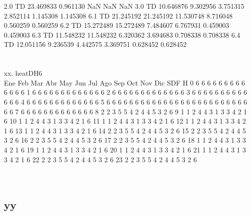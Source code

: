 \documentclass[a4paper,10pt,twocolumn]{article}
\begin{document}
\begin{Form}
2.0 TD  23.469833   0.961130        NaN        NaN        NaN          
3.0 TD  10.646876   9.302956   3.751315   2.852114   1.145308  1.145308
6.1 TD  21.245192  21.245192  11.530748   8.716048   0.560259  0.560259
6.2 TD  15.272489  15.272489   7.484607   6.767931   0.459003  0.459003
6.3 TD  11.548232  11.548232   6.320362   3.694683   0.708338  0.708338
6.4 TD  12.051156   9.236539   4.442575   3.369751   0.628452  0.628452 \\\\\\xx. heatDH6 \\     Ene  Feb  Mar  Abr  May  Jun  Jul  Ago  Sep  Oct  Nov  Dic  SDF
H                                                                  
0     6    6    6    6    6    6    6    6    6    6    6    6    6
1     6    6    6    6    6    6    6    6    6    6    6    6    6
2     6    6    6    6    6    6    6    6    6    6    6    6    6
3     6    6    6    6    6    6    6    6    6    6    6    6    6
4     6    6    6    6    6    6    6    6    6    6    6    6    6
5     6    6    6    6    6    6    6    6    6    6    6    6    6
6     6    6    6    6    6    6    6    6    6    6    6    6    6
7     6    6    6    6    6    6    6    6    6    6    6    6    6
8     2    2    3    5    5    4    2    4    4    5    3    2    6
9     1    1    2    4    4    3    1    3    3    4    2    1    6
10    1    1    2    4    4    3    1    3    3    4    2    1    6
11    1    1    2    4    4    3    1    3    3    4    2    1    6
12    1    1    2    4    4    3    1    3    3    4    2    1    6
13    1    1    2    4    4    3    1    3    3    4    2    1    6
14    2    2    3    5    5    4    2    4    4    5    3    2    6
15    2    2    3    5    5    4    2    4    4    5    3    2    6
16    2    2    3    5    5    4    2    4    4    5    3    2    6
17    2    2    3    5    5    4    2    4    4    5    3    2    6
18    1    1    2    4    4    3    1    3    3    4    2    1    6
19    1    1    2    4    4    3    1    3    3    4    2    1    6
20    1    1    2    4    4    3    1    3    3    4    2    1    6
21    1    1    2    4    4    3    1    3    3    4    2    1    6
22    2    2    3    5    5    4    2    4    4    5    3    2    6
23    2    2    3    5    5    4    2    4    4    5    3    2    6 \\\\\\
\newpage 
\subsection{yy}
\fi
\end{Form}
\end{document}
